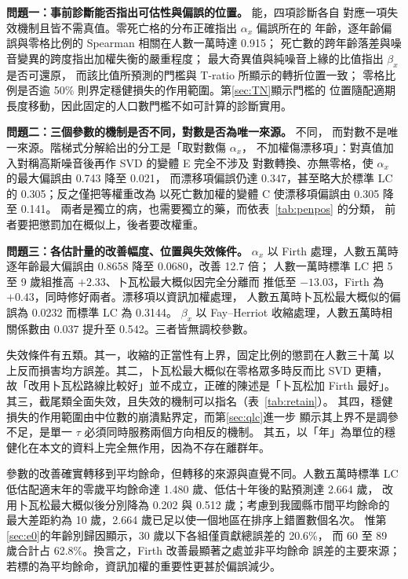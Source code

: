 \documentclass[UTF8, fontset=macnew, a4paper, 12pt]{ctexart}
\begin{document}
\textbf{問題一：事前診斷能否指出可估性與偏誤的位置。} 能，四項診斷各自
對應一項失效機制且皆不需真值。零死亡格的分布正確指出 $\alpha_x$ 偏誤所在的
年齡，逐年齡偏誤與零格比例的 Spearman 相關在人數一萬時達 0.915；
死亡數的跨年齡落差與噪音變異的跨度指出加權失衡的嚴重程度；
最大奇異值與純噪音上緣的比值指出 $\beta_x$ 是否可還原，
而該比值所預測的門檻與 T-ratio 所顯示的轉折位置一致；
零格比例是否逾 50\% 則界定穩健損失的作用範圍。第\ref{sec:TN}顯示門檻的
位置隨配適期長度移動，因此固定的人口數門檻不如可計算的診斷實用。

\textbf{問題二：三個參數的機制是否不同，對數是否為唯一來源。} 不同，
而對數不是唯一來源。階梯式分解給出的分工是「取對數傷 $\alpha_x$，
不加權傷漂移項」：對真值加入對稱高斯噪音後再作 SVD 的變體 E 完全不涉及
對數轉換、亦無零格，使 $\alpha_x$ 的最大偏誤由 0.743 降至 0.021，
而漂移項偏誤仍達 0.347，甚至略大於標準 LC 的 0.305；反之僅把等權重改為
以死亡數加權的變體 C 使漂移項偏誤由 0.305 降至 0.141。
兩者是獨立的病，也需要獨立的藥，而依表~\ref{tab:penpos} 的分類，
前者要把懲罰加在概似上，後者要改權重。

\textbf{問題三：各估計量的改善幅度、位置與失效條件。} $\alpha_x$ 以 Firth
處理，人數五萬時逐年齡最大偏誤由 0.8658 降至 0.0680，改善 12.7 倍；
人數一萬時標準 LC 把 5 至 9 歲組推高 $+2.33$、卜瓦松最大概似因完全分離而
推低至 $-13.03$，Firth 為 $+0.43$，同時修好兩者。漂移項以資訊加權處理，
人數五萬時卜瓦松最大概似的偏誤為 0.0232 而標準 LC 為 0.3144。
$\beta_x$ 以 Fay--Herriot 收縮處理，人數五萬時相關係數由 0.037 提升至
0.542。三者皆無調校參數。

失效條件有五類。其一，收縮的正當性有上界，固定比例的懲罰在人數三十萬
以上反而損害均方誤差。其二，卜瓦松最大概似在零格眾多時反而比 SVD 更糟，
故「改用卜瓦松路線比較好」並不成立，正確的陳述是「卜瓦松加 Firth 最好」。
其三，截尾類全面失效，且失效的機制可以指名（表~\ref{tab:retain}）。
其四，穩健損失的作用範圍由中位數的崩潰點界定，而第\ref{sec:qlc}進一步
顯示其上界不是調參不足，是單一 $\tau$ 必須同時服務兩個方向相反的機制。
其五，以「年」為單位的穩健化在本文的資料上完全無作用，因為不存在離群年。

參數的改善確實轉移到平均餘命，但轉移的來源與直覺不同。人數五萬時標準 LC
低估配適末年的零歲平均餘命達 1.480 歲、低估十年後的點預測達 2.664 歲，
改用卜瓦松最大概似後分別降為 0.202 與 0.512 歲；考慮到我國縣市間平均餘命的
最大差距約為 10 歲，2.664 歲已足以使一個地區在排序上錯置數個名次。
惟第\ref{sec:e0}的年齡別歸因顯示，30 歲以下各組僅貢獻總誤差的 20.6\%，
而 60 至 89 歲合計占 62.8\%。換言之，Firth 改善最顯著之處並非平均餘命
誤差的主要來源；若標的為平均餘命，資訊加權的重要性更甚於偏誤減少。
\end{document}
